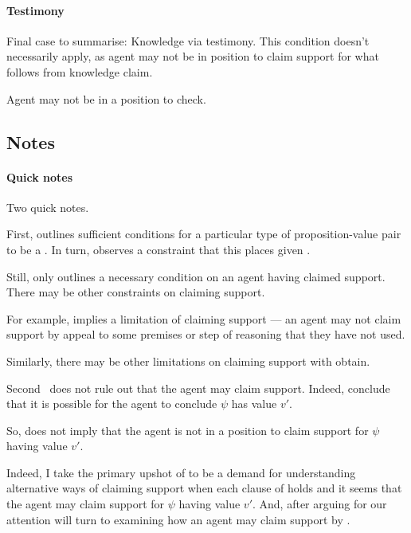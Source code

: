 \paragraph{Testimony}

\begin{note}
  Final case to summarise:
  Knowledge via testimony.
  This condition doesn't necessarily apply, as agent may not be in position to claim support for what follows from knowledge claim.

  Agent may not be in a position to check.
\end{note}


\subsection{Notes}
\label{sec:notes}

\paragraph{Quick notes}
\begin{note}
  Two quick notes.
\end{note}

\begin{note}
  First, \LCS{} outlines sufficient conditions for a particular type of proposition-value pair to be a \crequ{}.
  In turn, \FCS{} observes a constraint that this places given \ideaCS{}.

  Still, \ideaCS{} only outlines a necessary condition on an agent having claimed support.
  There may be other constraints on claiming support.

  For example, \ESU{} implies a limitation of claiming support --- an agent may not claim support by appeal to some premises or step of reasoning that they have not used.

  Similarly, there may be other limitations on claiming support with obtain.
\end{note}

\begin{note}
  Second~\FCS{} does not rule out that the agent may claim support.
  Indeed, conclude that it is possible for the agent to conclude \(\psi\) has value \(v'\).

  So, \nI{} does not imply that the agent is not in a position to claim support for \(\psi\) having value \(v'\).

  \color{red}
  Indeed, I take the primary upshot of \nI{} to be a demand for understanding alternative ways of claiming support when each clause of \nI{} holds and it seems that the agent may claim support for \(\psi\) having value \(v'\).
  And, after arguing for \nI{} our attention will turn to examining how an agent may claim support by \EAS{}.
\end{note}


